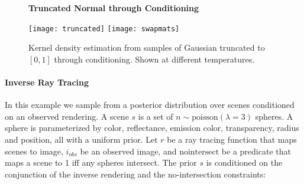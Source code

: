 \begin{figure}[!htb]
\centering
\textbf{Truncated Normal through Conditioning}\par\medskip
\texttt{[image: truncated]}
\texttt{[image: swapmats]}

	
	
	\caption{Kernel density estimation from samples of Gaussian truncated to $[0, 1]$ through conditioning. Shown at different temperatures.}
	\label{fig:density}
\end{figure}



\paragraph{Inverse Ray Tracing}
In this example we sample from a posterior distribution over scenes conditioned on an observed rendering.  A scene $s$ is a set of $n \sim \textrm{poisson}(\lambda = 3)$ spheres.
A sphere is parameterized by color, reflectance, emission color, transparency, radius and position, all with a uniform prior.
Let $r$ be a ray tracing function that maps scenes to image, $i_{obs}$ be an observed image, and $\textrm{nointersect}$ be a predicate that maps a scene to 1 iff any spheres intersect.
The prior $s$ is conditioned on the conjunction of the inverse rendering and the no-intersection constraints:


